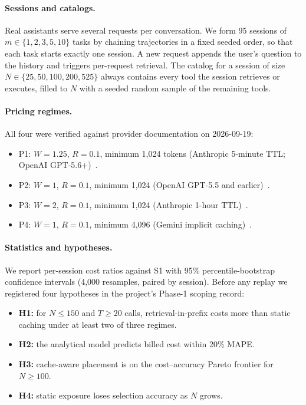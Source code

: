 \documentclass[11pt]{article}
\begin{document}
\paragraph{Sessions and catalogs.} Real assistants serve several requests per conversation. We form 95 sessions of $m \in \{1,2,3,5,10\}$ tasks by chaining trajectories in a fixed seeded order, so that each task starts exactly one session. A new request appends the user's question to the history and triggers per-request retrieval. The catalog for a session of size $N \in \{25,50,100,200,525\}$ always contains every tool the session retrieves or executes, filled to $N$ with a seeded random sample of the remaining tools.

\paragraph{Pricing regimes.} All four were verified against provider documentation on 2026-09-19:
\begin{itemize}
\item P1: $W{=}1.25$, $R{=}0.1$, minimum 1,024 tokens (Anthropic 5-minute TTL; OpenAI GPT-5.6+)~\cite{anth_cache,oai_cache}.
\item P2: $W{=}1$, $R{=}0.1$, minimum 1,024 (OpenAI GPT-5.5 and earlier)~\cite{oai_cache}.
\item P3: $W{=}2$, $R{=}0.1$, minimum 1,024 (Anthropic 1-hour TTL)~\cite{anth_cache}.
\item P4: $W{=}1$, $R{=}0.1$, minimum 4,096 (Gemini implicit caching)~\cite{gemini_price}.
\end{itemize}

\paragraph{Statistics and hypotheses.} We report per-session cost ratios against S1 with 95\% percentile-bootstrap confidence intervals (4,000 resamples, paired by session). Before any replay we registered four hypotheses in the project's Phase-1 scoping record:
\begin{itemize}
\item \textbf{H1:} for $N \leq 150$ and $T \geq 20$ calls, retrieval-in-prefix costs more than static caching under at least two of three regimes.
\item \textbf{H2:} the analytical model predicts billed cost within 20\% MAPE.
\item \textbf{H3:} cache-aware placement is on the cost--accuracy Pareto frontier for $N \geq 100$.
\item \textbf{H4:} static exposure loses selection accuracy as $N$ grows.
\end{itemize}
\end{document}
